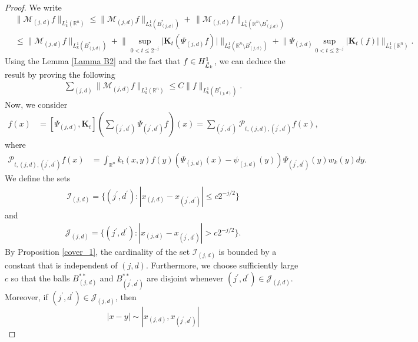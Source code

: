 \documentclass[11pt, reqno]{amsproc}
\theoremstyle{definition}
\theoremstyle{remark}
\numberwithin{equation}{section}
\begin{document}
\begin{proof}
We write 
\begin{align*}
   & \|\mathcal{M}_{(j,d)}f\|_{L_k^1(\mathbb{R}^n)} \leq \|\mathcal{M}_{(j,d)}f\|_{L_k^1\left(B_{(j,d)}^{*}\right)} + \,\|\mathcal{M}_{(j,d)}f\|_{L_k^1\left(\mathbb{R}^n \setminus B_{(j,d)}^{*}\right)} \\
    & \leq \|\mathcal{M}_{(j,d)}f\|_{L_k^1\left(B_{(j,d)}^{*}\right)} + \Bigg\| \sup_{0<t\leq 2^{-j}}\Big| \mathbf{K}_t\left(\Psi_{(j,d)}f\right) \Big| \Bigg\|_{L_k^1\left(\mathbb{R}^n \setminus B_{(j,d)}^{*}\right)} + \Bigg\| \Psi_{(j,d)} \sup_{0<t\leq 2^{-j}}\Big|\mathbf{K}_t(f) \Big|\Bigg\|_{L_k^1(\mathbb{R}^n)}.
\end{align*} Using the Lemma \ref{Lamma B2} and the fact that $f\in H_{\Tilde{\mathcal{L}}_k}^1$, we can deduce the result by proving the following 
   \begin{align*}
\sum_{(j,d)}\|\mathcal{M}_{(j,d)}f\|_{L_k^1(\mathbb{R}^n)} \leq C \|f\|_{L_k^1\left(B_{(j,d)}^{*}\right)}.
\end{align*}
 Now, we consider 
 \begin{align*}
    [\Psi_{(j,d)},\mathbf{K}_t] f(x) &=  [\Psi_{(j,d)},\mathbf{K}_t] \left(\sum_{(j^\prime, d^\prime)}\Psi_{(j^\prime,d^\prime)}f\right)(x)
    =  \sum_{(j^\prime, d^\prime)} \mathcal{P}_{t,(j,d),(j^\prime, d^\prime)}f(x),
 \end{align*}
 where 
\begin{align*}
    \mathcal{P}_{t,(j,d),(j^\prime, d^\prime)}f(x) 
    & = \int_{\mathbb{R}^n}k_t(x,y)f(y) \left( \Psi_{(j,d)}(x)-\psi_{(j,d)}(y) \right) \Psi_{(j^\prime,d^\prime)}(y)w_k(y)dy.
\end{align*}
We define the sets 
\begin{align*}
    \mathcal{I}_{(j,d)} = \{(j^\prime, d^\prime): |x_{(j,d)} - x_{(j^\prime,d^\prime)}| \leq c2^{-j/2}  \}
\end{align*}
and \begin{align*}
    \mathcal{J}_{(j,d)}=\{(j^\prime, d^\prime): |x_{(j,d)} - x_{(j^\prime,d^\prime)}| > c2^{-j/2}  \}.
\end{align*}
By Proposition \ref{cover_1}, the cardinality of the set $\mathcal{I}_{(j,d)}$ is bounded by a constant that is independent of $(j,d)$. Furthermore, we choose sufficiently large ${c}$  so that the balls $B_{(j,d)}^{**}$ and $B_{(j^{\prime},d^{\prime})}^{**}$ are disjoint whenever $(j^{\prime},d^{\prime}) \in \mathcal{J}_{(j,d)}$. Moreover, if $(j^{\prime},d^{\prime}) \in \mathcal{J}_{(j,d)}$, then
\[
|x- y| \sim |x_{(j,d)}, x_{(j^{\prime},d^{\prime})}|
\]
\end{proof}
\end{document}
